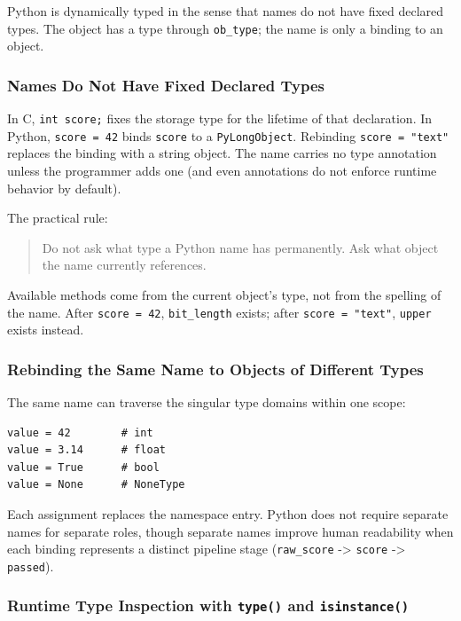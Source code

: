 \documentclass[a4paper,twoside]{report}
\begin{document}
Python is dynamically typed in the sense that names do not have fixed declared types. The object has a type through \texttt{ob\_type}; the name is only a binding to an object.

\subsubsection{Names Do Not Have Fixed Declared Types}

In C, \texttt{int score;} fixes the storage type for the lifetime of that declaration. In Python, \texttt{score = 42} binds \texttt{score} to a \texttt{PyLongObject}. Rebinding \texttt{score = "text"} replaces the binding with a string object. The name carries no type annotation unless the programmer adds one (and even annotations do not enforce runtime behavior by default).

The practical rule:

\begin{quote}
Do not ask what type a Python name has permanently. Ask what object the name currently references.
\end{quote}

Available methods come from the current object's type, not from the spelling of the name. After \texttt{score = 42}, \texttt{bit\_length} exists; after \texttt{score = "text"}, \texttt{upper} exists instead.

\subsubsection{Rebinding the Same Name to Objects of Different Types}

The same name can traverse the singular type domains within one scope:

\begin{verbatim}
value = 42        # int
value = 3.14      # float
value = True      # bool
value = None      # NoneType
\end{verbatim}

Each assignment replaces the namespace entry. Python does not require separate names for separate roles, though separate names improve human readability when each binding represents a distinct pipeline stage (\texttt{raw\_score} -> \texttt{score} -> \texttt{passed}).

\subsubsection{Runtime Type Inspection with \texttt{type()} and \texttt{isinstance()}}
\end{document}
